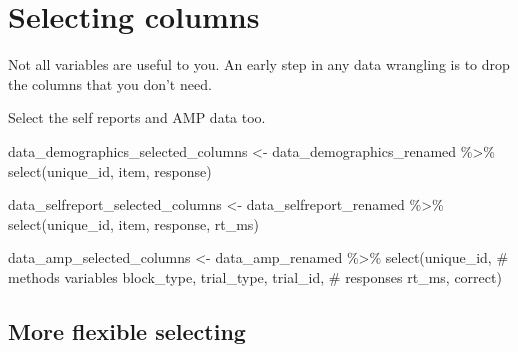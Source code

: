 \documentclass[
  letterpaper,
  DIV=11,
  numbers=noendperiod]{scrreprt}
\newenvironment{Shaded}{\begin{snugshade}}{\end{snugshade}}
\newcommand{\CommentTok}[1]{\textcolor[rgb]{0.37,0.37,0.37}{#1}}
\newcommand{\FunctionTok}[1]{\textcolor[rgb]{0.28,0.35,0.67}{#1}}
\newcommand{\NormalTok}[1]{\textcolor[rgb]{0.00,0.23,0.31}{#1}}
\newcommand{\OtherTok}[1]{\textcolor[rgb]{0.00,0.23,0.31}{#1}}
\newcommand{\SpecialCharTok}[1]{\textcolor[rgb]{0.37,0.37,0.37}{#1}}
\begin{document}
\section{Selecting columns}\label{selecting-columns}

Not all variables are useful to you. An early step in any data wrangling
is to drop the columns that you don't need.

Select the self reports and AMP data too.

\begin{Shaded}
\begin{Highlighting}[]
\NormalTok{data\_demographics\_selected\_columns }\OtherTok{\textless{}{-}}\NormalTok{ data\_demographics\_renamed }\SpecialCharTok{\%\textgreater{}\%}
  \FunctionTok{select}\NormalTok{(unique\_id, item, response)}

\NormalTok{data\_selfreport\_selected\_columns }\OtherTok{\textless{}{-}}\NormalTok{ data\_selfreport\_renamed }\SpecialCharTok{\%\textgreater{}\%}
  \FunctionTok{select}\NormalTok{(unique\_id, item, response, rt\_ms)}

\NormalTok{data\_amp\_selected\_columns }\OtherTok{\textless{}{-}}\NormalTok{ data\_amp\_renamed }\SpecialCharTok{\%\textgreater{}\%}
  \FunctionTok{select}\NormalTok{(unique\_id, }
         \CommentTok{\# methods variables}
\NormalTok{         block\_type,}
\NormalTok{         trial\_type,}
\NormalTok{         trial\_id,}
         \CommentTok{\# responses }
\NormalTok{         rt\_ms, }
\NormalTok{         correct)}
\end{Highlighting}
\end{Shaded}

\subsection{More flexible selecting}\label{more-flexible-selecting}
\end{document}
